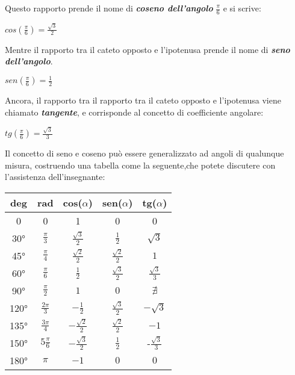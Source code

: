 Questo rapporto prende il nome di {\bf \slshape coseno dell'angolo} $\frac \pi 6$ e si scrive:
\begin{center}
\begin{math}
cos(\frac \pi 6) = \frac {\sqrt 3} 2
\end{math}
\end{center}
Mentre il rapporto tra il cateto opposto e l'ipotenusa prende il nome di {\bfseries \slshape seno dell'angolo}.
\begin{center}
\begin{math}
sen(\frac \pi 6) = \frac 1 2
\end{math}
\end{center}
Ancora, il rapporto tra il rapporto tra il cateto opposto e l'ipotenusa viene chiamato {\bf \slshape tangente}, e corrisponde al concetto di coefficiente angolare:
\begin{center}
\begin{math}
tg(\frac \pi 6) = \frac {\sqrt 3} 3
\end{math}
\end{center}
Il concetto di seno e coseno può essere generalizzato ad angoli di qualunque misura, costruendo una tabella come la seguente,che potete discutere con l'assistenza dell'insegnante:\newline
\begin{center}
\begin{tabular}{|c|c|c|c|c|}
\hline
deg & rad & cos($\alpha$) & sen($\alpha$) & tg($\alpha$) \\
\hline
0 & 0 & 1 & 0 & 0 \\
\hline
30° & $\frac \pi 3$ & $\frac {\sqrt 3} 2$ & $\frac 1 2$ & $\sqrt 3$ \\
\hline
45° & $\frac \pi 4$ & $\frac {\sqrt 2} 2$ & $\frac {\sqrt 2} 2$ & $1$ \\
\hline
60° & $\frac \pi 6$ & $\frac 1 2$ & $\frac {\sqrt 3} 2$ & $\frac {\sqrt 3} 3$ \\
\hline
90° & $\frac \pi 2$ & $1$ & $0$ & $\nexists$ \\
\hline
120° & $\frac {2 \pi} 3$ & $-\frac 1 2$ & $\frac {\sqrt 3} {2}$ & $-\sqrt 3$ \\
\hline
135° & $\frac {3 \pi} 4$ & $-\frac {\sqrt 2} 2$ & $\frac {\sqrt 2} {2}$ & $-1$ \\
\hline
150° & $5 \frac \pi 6$ & $-\frac {\sqrt 3} 2$ & $\frac 1 2$ & -$\frac {\sqrt 3} {3}$ \\
\hline
180° & $\pi $ & $-1$ & $0$ & $0$ \\
\hline
\end{tabular}
\end{center}


